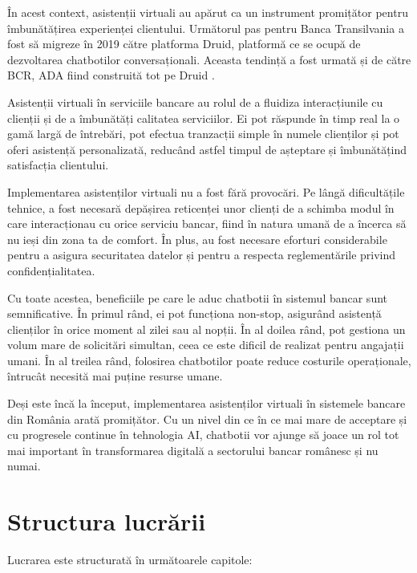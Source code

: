 În acest context, asistenții virtuali au apărut ca un instrument promițător pentru îmbunătățirea experienței clientului. Următorul pas pentru Banca Transilvania a fost să migreze în 2019 către platforma Druid, platformă ce se ocupă de dezvoltarea chatbotilor conversaționali. Aceasta tendință a fost urmată și de către BCR, ADA fiind construită tot pe Druid \cite{ADA}.

Asistenții virtuali în serviciile bancare au rolul de a fluidiza interacțiunile cu clienții și de a îmbunătăți calitatea serviciilor. Ei pot răspunde în timp real la o gamă largă de întrebări, pot efectua tranzacții simple în numele clienților și pot oferi asistență personalizată, reducând astfel timpul de așteptare și îmbunătățind satisfacția clientului.

Implementarea asistenților virtuali nu a fost fără provocări. Pe lângă dificultățile tehnice, a fost necesară depășirea reticenței unor clienți de a schimba modul în care interacționau cu orice serviciu bancar, fiind în natura umană de a încerca să nu ieși din zona ta de comfort. În plus, au fost necesare eforturi considerabile pentru a asigura securitatea datelor și pentru a respecta reglementările privind confidențialitatea.

Cu toate acestea, beneficiile pe care le aduc chatbotii în sistemul bancar sunt semnificative. În primul rând, ei pot funcționa non-stop, asigurând asistență clienților în orice moment al zilei sau al nopții. În al doilea rând, pot gestiona un volum mare de solicitări simultan, ceea ce este dificil de realizat pentru angajații umani. În al treilea rând, folosirea chatbotilor poate reduce costurile operaționale, întrucât necesită mai puține resurse umane.

Deși este încă la început, implementarea asistenților virtuali în sistemele bancare din România arată promițător. Cu un nivel din ce în ce mai mare de acceptare și cu progresele continue în tehnologia AI, chatbotii vor ajunge să joace un rol tot mai important în transformarea digitală a sectorului bancar românesc și nu numai.

\section{Structura lucrării}

Lucrarea este structurată în următoarele capitole:

